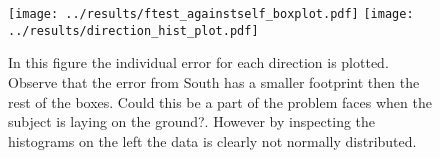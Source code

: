 \begin{figure}
\begin{center}
    \texttt{[image: ../results/ftest\_againstself\_boxplot.pdf]}
    \texttt{[image: ../results/direction\_hist\_plot.pdf]}
\end{center}
\caption{
In this figure the individual error for each direction is plotted. Observe that the error from South has a smaller footprint then the rest of the boxes. Could this be a part of the problem \openpose faces when the subject is laying on the ground?. However by inspecting the histograms on the left the data is clearly not normally distributed. }
\label{fig:results:dirbox}
\end{figure}



